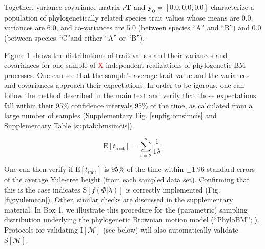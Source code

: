 \documentclass[oneside]{article}
\begin{document}
\begin{tcolorbox}[breakable, width=\textwidth, colback=gray!10, boxrule=0pt,
  title=Box 1: Models characterized by well-known parametric distributions, fonttitle=\bfseries]
Together, variance-covariance matrix $r\boldsymbol{T}$ and
$\boldsymbol{y_0} = [0.0, 0.0, 0.0]$ characterize a
population of phylogenetically related species trait values
whose means are 0.0, variances are 6.0, and co-variances
are 5.0 (between species ``A'' and ``B'') and 0.0 (between
species ``C''and
either ``A'' or ``B'').

\vspace{.25cm}

Figure 1 shows the distributions of trait values and their variances
and covariances for one sample of \textcolor{red}{X} independent
realizations of phylogenetic BM processes.
One can see that the sample's average trait value and the
variances and covariances approach their expectations.
In order to be igorous, one can follow the method described
in the main text and verify that those expectations fall within
their 95\% confidence intervals 95\% of the time, as calculated
from a large number of samples (Supplementary Fig. \ref{supfig:bmsimcis} and
Supplementary Table \ref{suptab:bmsimcis}).
%
%
\end{tcolorbox}

\begin{equation}
  \text{E}[t_{\text{root}}] = \sum_{i=2}^{n}\frac{1}{1\lambda}.
  \label{eq:yule}
\end{equation}

\noindent One can then verify if $\text{E}[t_{\text{root}}]$ is $95\%$
of the time within $\pm 1.96$ standard errors of the average
Yule-tree height (from each sampled data set).
Confirming that this is the case indicates $\text{S}[f(\Phi|\lambda)]$ is correctly
implemented (Fig. \ref{fig:yulemean}).
Other, similar checks are discussed in the supplementary material.
In Box 1, we illustrate this procedure for the (parametric) sampling distribution
underlying the phylogenetic Brownian motion model (``PhyloBM''; \citealp{felsenstein73}).
Protocols for validating $\text{I}[\mathcal{M}]$ (see below) will also automatically validate
$\text{S}[\mathcal{M}]$.
\end{document}
